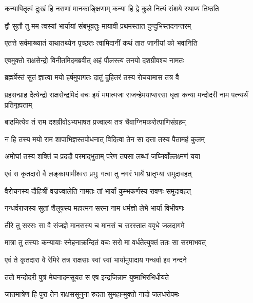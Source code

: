 \twolineshloka
{कन्यापितृत्वं दुःखं हि नराणां मानकाङ्क्षिणाम्}
{कन्या हि द्वे कुले नित्यं संशये स्थाप्य तिष्ठति} %

\twolineshloka
{द्वौ सुतौ तु मम त्वस्यां भार्यायां संबभूवतुः}
{मायावी प्रथमस्तात दुन्दुभिस्तदनन्तरम्} %

\twolineshloka
{एतत्ते सर्वमाख्यातं याथातथ्येन पृच्छतः}
{त्वामिदानीं कथं तात जानीयां को भवानिति} %

\twolineshloka
{एवमुक्तो राक्षसेन्द्रो विनीतमिदमब्रवीत्}
{अहं पौलस्त्य तनयो दशग्रीवश्च नामतः} %

\twolineshloka
{ब्रह्मर्षेस्तं सुतं ज्ञात्वा मयो हर्षमुपागतः}
{दातुं दुहितरं तस्य रोचयामास तत्र वै} %

\threelineshloka
{प्रहसन्प्राह दैत्येन्द्रो राक्षसेन्द्रमिदं वचः}
{इयं ममात्मजा राजन्हेमयाप्सरसा धृता}
{कन्या मन्दोदरी नाम पत्न्यर्थं प्रतिगृह्यताम्} %

\twolineshloka
{बाढमित्येव तं राम दशग्रीवोऽभ्यभाषत}
{प्रज्वाल्य तत्र चैवाग्निमकरोत्पाणिसंग्रहम्} %

\twolineshloka
{न हि तस्य मयो राम शापाभिज्ञस्तपोधनात्}
{विदित्वा तेन सा दत्ता तस्य पैतामहं कुलम्} %

\twolineshloka
{अमोघां तस्य शक्तिं च प्रददौ परमाद्भुताम्}
{परेण तपसा लब्धां जघ्निवाँल्लक्ष्मणं यया} %

\twolineshloka
{एवं स कृतदारो वै लङ्कायामीश्वरः प्रभुः}
{गत्वा तु नगरं भार्ये भ्रातृभ्यां समुदावहत्} %

\twolineshloka
{वैरोचनस्य दौहित्रीं वज्रज्वालेति नामतः}
{तां भार्यां कुम्भकर्णस्य रावणः समुदावहत्} %

\twolineshloka
{गन्धर्वराजस्य सुतां शैलूषस्य महात्मन}
{सरमा नाम धर्मज्ञो लेभे भार्यां विभीषणः} %

\twolineshloka
{तीरे तु सरसः सा वै संजज्ञे मानसस्य च}
{मानसं च सरस्तात ववृधे जलदागमे} %

\twolineshloka
{मात्रा तु तस्याः कन्यायाः स्नेहनाक्रन्दितं वचः}
{सरो मा वर्धतेत्युक्तं ततः सा सरमाभवत्} %

\twolineshloka
{एवं ते कृतदारा वै रेमिरे तत्र राक्षसाः}
{स्वां स्वां भार्यामुपादाय गन्धर्वा इव नन्दने} %

\twolineshloka
{ततो मन्दोदरी पुत्रं मेघनादमसूयत}
{स एष इन्द्रजिन्नाम युष्माभिरभिधीयते} %

\twolineshloka
{जातमात्रेण हि पुरा तेन राक्षससूनुना}
{रुदता सुमहान्मुक्तो नादो जलधरोपमः} %

